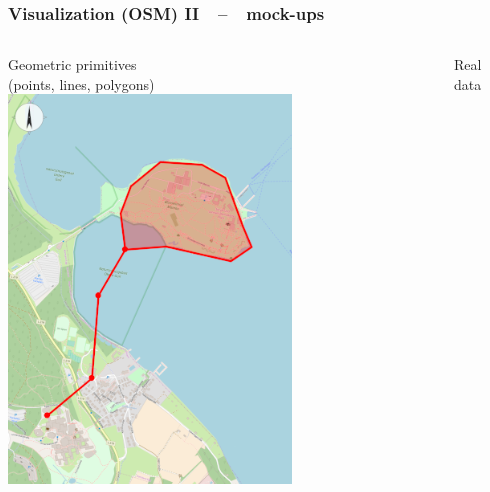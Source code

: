 \documentclass[xcolor=dvipsnames]{beamer}
\begin{document}
\begin{frame}
	\frametitle{\textbf{Visualization (OSM) II}~~--~~mock-ups}
	\begin{columns}
	\begin{column}{0.5\textwidth}
		Geometric primitives\\
		(points, lines, polygons)
		\includegraphics[width=\textwidth]{screenshots/vis-functional-1.PNG}
	\end{column}
	\begin{column}{0.56\textwidth}
		Real data

\end{column}
\end{columns}
\end{frame}
\end{document}
